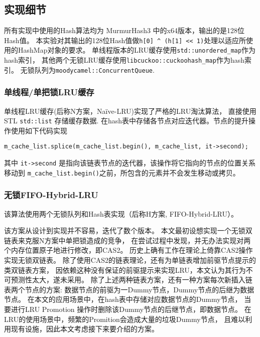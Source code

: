\subsection{实现细节}

所有实现中使用的Hash算法均为 MurmurHash3\cite{smhasher} 中的x64版本，输出的是128位Hash值。
本实验对其输出的128位Hash值做\verb|h[0] ^ (h[1] << 1)|处理以适应所使用的HashMap对象的要求。
单线程版本的LRU缓存使用\verb|std::unordered_map|作为hash索引，
其他两个无锁LRU缓存使用\verb|libcuckoo::cuckoohash_map|\cite{libcuckoo}作为hash索引。
无锁队列为\verb|moodycamel::ConcurrentQueue|\cite{cameron_concurrentqueue}.

\subsubsection{单线程/单把锁LRU缓存}

单线程LRU缓存(后称N方案，Na\"{i}ve-LRU)实现了严格的LRU淘汰算法，
直接使用STL \verb|std::list| 存储缓存数据.
在hash表中存储各节点对应迭代器。节点的提升操作使用如下代码实现 
\begin{verbatim}
m_cache_list.splice(m_cache_list.begin(), m_cache_list, it->second);
\end{verbatim}
其中 \verb|it->second| 是指向该链表节点的迭代器，该操作将它指向的节点的位置关系移动到
\verb|m_cache_list.begin()|之前，所包含的元素并不会发生移动或拷贝。

\subsubsection{无锁FIFO-Hybrid-LRU}\label{sec:fifo-hybrid}

该算法使用两个无锁队列和Hash表实现（后称H方案, FIFO-Hybrid-LRU）。

该方案从设计到实现并不容易，迭代了数个版本。
本文最初设想实现一个无锁双链表来克服N方案中单把锁造成的竞争，
在尝试过程中发现，并无办法实现对两个内存位置原子地进行修改，即CAS2。
历史上确有工作在理论上倚靠CAS2操作实现无锁双链表。
除了使用CAS2的链表理论，还有为单链表增加前驱节点提示的类双链表方案，
因依赖这种没有保证的前驱提示来实现LRU，本文认为其行为不可预测性太大，遂未采用。
除了上述两种链表方案，还有一种方案每次新插入链表两个节点的方案:
数据节点的前驱为一Dummy节点，Dummy节点的后继为数据节点。
在本文的应用场景中，在hash表中存储对应数据节点的Dummy节点，
当要进行LRU Promotion 操作时删除该Dummy节点的后继节点，即数据节点。
在LRU的使用场景中，频繁的Promition会造成大量的垃圾Dummy节点，
且难以利用现有设施，因此本文考虑接下来要介绍的方案。

